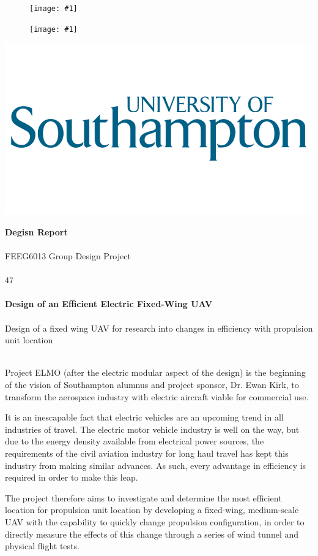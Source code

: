 \documentclass[11pt,landscape]{report}
\newcommand{\appendiximage}[2]{
    \begin{figure}[H]
        \begin{center}
        \texttt{[image: \#1]}
        \end{center}
    \end{figure}
}
\begin{document}
\begin{multicols*}{2}

    \appendiximage{elmo-logo}{0.95}
    \vspace{150px}
    \appendiximage{cover-image}{0.95}

\columnbreak
\columnbreak

\begin{titlepage}
    \begin{flushright}
    \includegraphics[width=0.3\columnwidth]{soton-logo}
    \end{flushright}
    \large{\textbf{Degisn Report}} \tiny{\\}\tiny{\\}
    \large{FEEG6013 Group Design Project} \\
    \vspace{1cm} \\
    \huge{47} \large{\\}\large{\\}
    \LARGE\textbf{Design of an Efficient Electric Fixed-Wing UAV} \large{\\}\large{\\}
    \large{Design of a fixed wing UAV for research into changes in efficiency with propulsion unit location} \large{\\}
    \vspace{1cm} \\
    \small{
        Project ELMO (after the electric modular aspect of the design) is the beginning of the vision of Southampton alumnus and project sponsor, Dr. Ewan Kirk, to transform the aerospace industry with electric aircraft viable for commercial use.
        
        It is an inescapable fact that electric vehicles are an upcoming trend in all industries of travel. 
        The electric motor vehicle industry is well on the way, but due to the energy density available from electrical power sources, the requirements of the civil aviation industry for long haul travel has kept this industry from making similar advances.
        As such, every advantage in efficiency is required in order to make this leap. 

        The project therefore aims to investigate and determine the most efficient location for propulsion unit location by developing a fixed-wing, medium-scale UAV with the capability to quickly change propulsion configuration, in order to directly measure the effects of this change through a series of wind tunnel and physical flight tests. 

}
\end{titlepage}
\end{multicols*}
\end{document}
